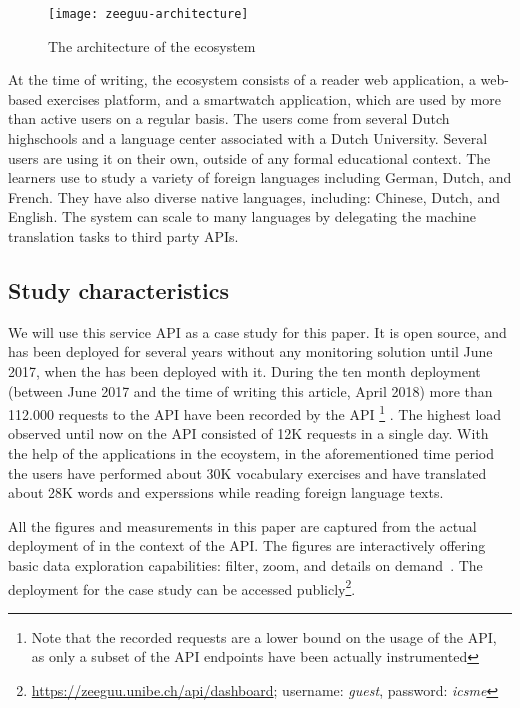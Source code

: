     \begin{figure}[h!]
      \centering
      \texttt{[image: zeeguu-architecture]}
      \caption{The architecture of the \zee ecosystem \cite{lungu18-chi}}
      \label{fig:zeeguuarch}
    \end{figure}  


  At the time of writing, the ecosystem consists of a reader web application, a web-based exercises platform, and a smartwatch application, which are used by more than \activeUserCount active users on a regular basis. The users come from several Dutch highschools and a language center associated with a Dutch University. Several users are using it on their own, outside of any formal educational context. The learners use \zee to study a variety of foreign languages including German, Dutch, and French. They have also diverse native languages, including: Chinese, Dutch, and English. The system can scale to many languages by delegating the machine translation tasks to third party APIs. 



\subsection{Study characteristics}

  We will use this \zee service API as a case study for this paper. It is open source, and has been deployed for several years without any monitoring
  solution until June 2017, when the \tool has been deployed with it. 
  During the ten month deployment (between June 2017 and the time of writing this
  article, April 2018) more than 112.000 requests
  to the API have been recorded by the API \footnote{Note that the 
  recorded requests are a lower bound on the usage of the API, 
  as only a subset of the API endpoints have been actually instrumented} . The highest load observed 
  until now on the API consisted of 12K requests in a single day. 
  With the help of the applications in the ecoystem, in the aforementioned
  time period the users have 
  performed about 30K vocabulary exercises and have translated 
  about 28K words and experssions while reading foreign language 
  texts. 

  All the figures and measurements in this paper are captured from the actual deployment of \tool in the context of the \zee API. The figures are interactively offering basic data exploration capabilities: filter, zoom, and details on demand~\cite{Shne99a}. The \tool deployment for the case study can be accessed publicly\footnote{\url{https://zeeguu.unibe.ch/api/dashboard}; username: {\em guest}, password: {\em icsme}}. 


